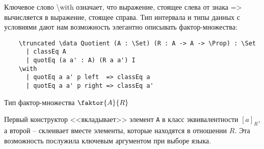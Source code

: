 Ключевое слово \textbackslash{}with означает, что выражение, стоящее слева от знака => вычисляется в выражение, стоящее справа. Тип интервала и типы данных с условиями дают нам возможность элегантно описывать фактор-множества:

\begin{listing}[H]
  \begin{verbatim}
    \truncated \data Quotient (A : \Set) (R : A -> A -> \Prop) : \Set
      | classEq A
      | quotEq (a a' : A) (R a a') I
    \with
      | quotEq a a' p left  => classEq a
      | quotEq a a' p right => classEq a'
  \end{verbatim}
  \caption{Тип фактор-множества $\faktor{A}{R}$}
\end{listing}

Первый конструктор <<вкладывает>> элемент \texttt{A} в класс эквивалентности $[a]_{R}$, а второй -- склеивает вместе элементы, которые находятся в отношении $R$. Эта возможность послужила ключевым аргументом при выборе языка.
